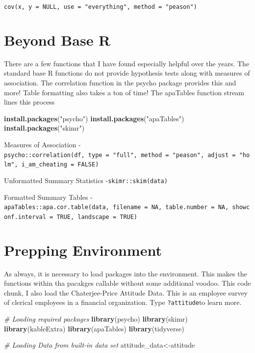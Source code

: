 \documentclass[]{book}
\newenvironment{Shaded}{\begin{snugshade}}{\end{snugshade}}
\newcommand{\CommentTok}[1]{\textcolor[rgb]{0.56,0.35,0.01}{\textit{#1}}}
\newcommand{\KeywordTok}[1]{\textcolor[rgb]{0.13,0.29,0.53}{\textbf{#1}}}
\newcommand{\NormalTok}[1]{#1}
\newcommand{\StringTok}[1]{\textcolor[rgb]{0.31,0.60,0.02}{#1}}
\theoremstyle{definition}
\theoremstyle{definition}
\theoremstyle{definition}
\theoremstyle{remark}
\begin{document}
\texttt{cov(x,\ y\ =\ NULL,\ use\ =\ "everything",\ method\ =\ "peason")}

\hypertarget{beyond-base-r}{%
\section{Beyond Base R}\label{beyond-base-r}}

There are a few functions that I have found especially helpful over the years. The standard base R functions do not provide hypothesis tests along with measures of association. The correlation function in the psycho package provides this and more! Table formatting also takes a ton of time! The apaTables function stream lines this process

\begin{Shaded}
\begin{Highlighting}[]
\KeywordTok{install.packages}\NormalTok{(}\StringTok{"psycho"}\NormalTok{)}
\KeywordTok{install.packages}\NormalTok{(}\StringTok{"apaTables"}\NormalTok{)}
\KeywordTok{install.packages}\NormalTok{(}\StringTok{"skimr"}\NormalTok{)}
\end{Highlighting}
\end{Shaded}

Measures of Association
- \texttt{psycho::correlation(df,\ type\ =\ "full",\ method\ =\ "peason",\ adjust\ =\ "holm",\ i\_am\_cheating\ =\ FALSE)}

Unformatted Summary Statistics
-\texttt{skimr::skim(data)}

Formatted Summary Tables
- \texttt{apaTables::apa.cor.table(data,\ filename\ =\ NA,\ table.number\ =\ NA,\ showconf.interval\ =\ TRUE,\ landscape\ =\ TRUE)}

\hypertarget{prepping-environment}{%
\section{Prepping Environment}\label{prepping-environment}}

As always, it is necessary to load packages into the environment. This makes the functions within tha pacakges callable without some additional voodoo. This code chunk, I also load the Chaterjee-Price Attitude Data. This is an employee survey of clerical employees in a financial organization. Type \texttt{?attitude}to learn more.

\begin{Shaded}
\begin{Highlighting}[]
\CommentTok{# Loading required packages}
\KeywordTok{library}\NormalTok{(psycho)}
\KeywordTok{library}\NormalTok{(skimr)}
\KeywordTok{library}\NormalTok{(kableExtra)}
\KeywordTok{library}\NormalTok{(apaTables)}
\KeywordTok{library}\NormalTok{(tidyverse)}

\CommentTok{# Loading Data from built-in data set}
\NormalTok{attitude_data<-attitude}
\end{Highlighting}
\end{Shaded}
\end{document}
